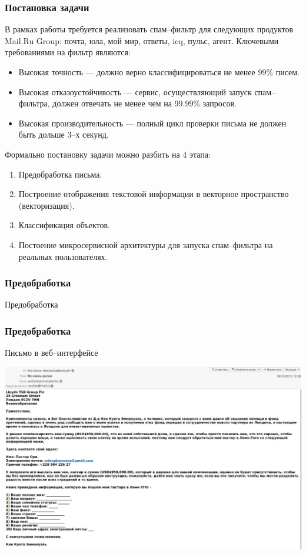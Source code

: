 \documentclass[compress,professionalfont]{beamer}
\begin{document}
\begin{frame}
\frametitle{Постановка задачи}

В рамках работы требуется реализовать спам--фильтр для следующих продуктов Mail.Ru Group: почта, юла, мой мир, ответы, icq, пульс, агент. Ключевыми требованиями на фильтр являются:
\begin{itemize}
\item Высокая точность --- должно верно классифицироваться не менее 99\% писем.
\item Высокая отказоустойчивость --- сервис, осуществляющий запуск спам--фильтра, должен отвечать не менее чем на 99.99\% запросов.
\item Высокая производительность --- полный цикл проверки письма не должен быть дольше 3--х секунд.
\end{itemize}

Формально постановку задачи можно разбить на 4 этапа:
\begin{enumerate}
\item Предобработка письма.
\item Построение отображения текстовой информации в векторное пространство (векторизация).
\item Классификация объектов.
\item Постоение микросервисной архитектуры для запуска спам--фильтра на реальных пользователях.
\end{enumerate}

\end{frame}

\begin{frame}
\frametitle{Предобработка}

\begin{center}
Предобработка
\end{center}

\end{frame}

\begin{frame}
\frametitle{Предобработка}

Письмо в веб--интерфейсе
\begin{center}
\includegraphics[width=.9\textwidth]{eml.jpg}
\end{center}

\end{frame}
\end{document}
